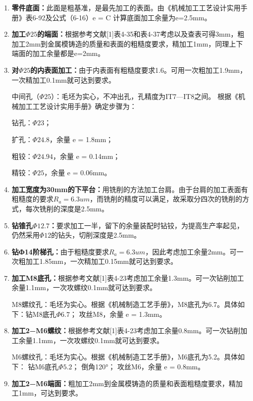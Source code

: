 \documentclass[12pt,a4paper,fontset=none]{ctexart}
\begin{document}
    \begin{enumerate}
        \item \textbf{零件底面：}此面是粗基准，是最先加工的表面。由《机械加工工艺设计实用手册》表6-92及公式（6-16）e = C 计算底面加工余量为e=2.5mm。
        \item \textbf{加工$\Phi25$的端面：}根据参考文献[1]表4-35和表4-37考虑以及查表可得3mm，粗加工2mm到金属模铸造的质量和表面的粗糙度要求，精加工1mm，同理上下端面的加工余量都是e=2mm。
        \item \textbf{对$\Phi25$的内表面加工：}由于内表面有粗糙度要求1.6。可用一次粗加工1.9mm，一次精加工0.1mm就可达到要求。

        中间孔（$\Phi25$）：毛坯为实心，不冲出孔，孔精度为IT7—IT8之间。
        根据《机械加工工艺设计实用手册》确定步骤为：

        钻孔：$\Phi23$；

        扩孔：$\Phi24.8$，余量 e = 1.8mm；

        粗铰：$\Phi24.94$，余量 e = 0.14mm；

        精铰：$\Phi25$，余量 e = 0.06mm。
        \item \textbf{加工宽度为30mm的下平台：}用铣削的方法加工台肩。由于台肩的加工表面有粗糙度的要求$R_a=6.3um$，而铣削的精度可以满足，故采取分四次的铣削的方式，每次铣削的深度是2.5mm。
        \item \textbf{钻锥孔$\Phi12.7$：}要求加工一半，留下的余量装配时钻铰，为提高生产率起见，仍然采用$\Phi12$的钻头，切削深度是2.5mm。
        \item \textbf{钻Ф14阶梯孔：}由于粗糙度要求$R_a=6.3um$，因此考虑加工余量2mm。可一次粗加工1.85mm，一次精加工0.15mm就可达到要求。
        \item \textbf{加工M8底孔：}根据参考文献[1]表4-23考虑加工余量1.3mm。可一次钻削加工余量1.1mm，一次攻螺纹0.1mm就可达到要求。

        M8螺纹孔：毛坯为实心。根据《机械制造工艺手册》，M8底孔为6.7。具体如下：钻M8底孔$\Phi6.7$； 攻丝M8，余量 e = 1.3mm。
        \item \textbf{加工2−M6螺纹：}根据参考文献[1]表4-23考虑加工余量0.8mm。可一次钻削加工余量1.1mm，一次攻螺纹0.1mm就可达到要求。

        M6螺纹孔：毛坯为实心。根据《机械制造工艺手册》，M6底孔为5.2。具体如下：
        钻M6底孔$\Phi5.2$；
        倒角120°；
        攻丝M6，余量 e = 0.8mm。
        \item \textbf{加工2−M6端面：}粗加工2mm到金属模铸造的质量和表面粗糙度要求，精加工1mm，可达到要求。
    \end{enumerate}
\end{document}
